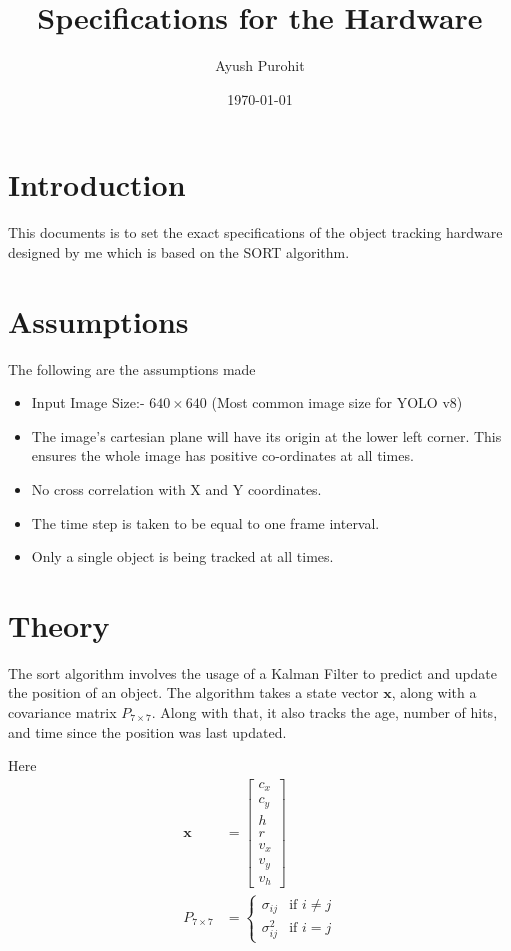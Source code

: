 \documentclass[10pt]{article}
\title{Specifications for the Hardware}
\author{Ayush Purohit}
\date{\today}
\begin{document}
    \maketitle

    \section{Introduction}
    This documents is to set the exact specifications of the object tracking hardware designed by me which is based on the SORT algorithm.

    \section{Assumptions}
    The following are the assumptions made
    \begin{itemize}
        \item Input Image Size:- \( 640 \times 640\) (Most common image size for YOLO v8)
        \item The image's cartesian plane will have its origin at the lower left corner. This ensures the whole image has positive co-ordinates at all times.
        \item No cross correlation with X and Y coordinates.
        \item The time step is taken to be equal to one frame interval.
        \item Only a single object is being tracked at all times.
    \end{itemize}

    \section{Theory}
    The sort algorithm involves the usage of a Kalman Filter to predict and update the position of an object. The algorithm takes a state vector 
    \(\mathbf{x}\), along with a covariance matrix \(P_{7 \times 7}\). Along with that, it also tracks the age, number of hits, and time since the position was last 
    updated. 
    
    \noindent Here
    \begin{align*}
        \mathbf{x} &= \begin{bmatrix}
                        c_x \\
                        c_y \\
                        h \\
                        r \\
                        v_x \\
                        v_y \\
                        v_h
                        \end{bmatrix} \\
        P_{7 \times 7} &= \begin{cases}
            \sigma_{ij} & \text{if } i \not= j \\
            \sigma^2_{ij} & \text{if } i = j
        \end{cases}
    \end{align*}
    
\end{document}
